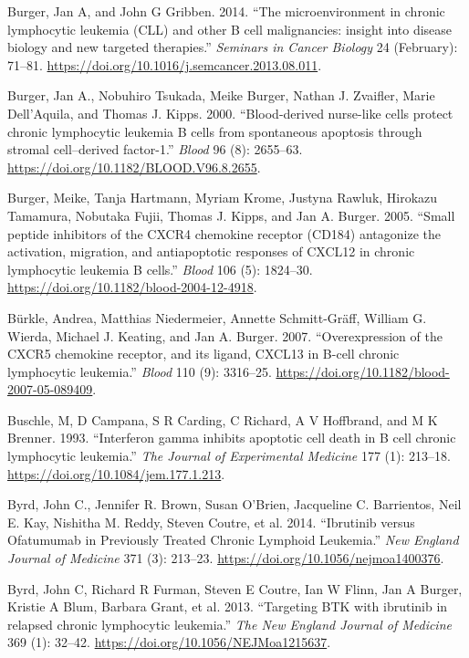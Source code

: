 \documentclass[11pt, a4paper, twosided]{book}
\newenvironment{CSLReferences}%
  {}%
  {\par}
\begin{document}
\begin{CSLReferences}{1}{0}
\leavevmode{}%
Burger, Jan A, and John G Gribben. 2014. {``{The microenvironment in chronic lymphocytic leukemia (CLL) and other B cell malignancies: insight into disease biology and new targeted therapies.}''} \emph{Seminars in Cancer Biology} 24 (February): 71--81. \url{https://doi.org/10.1016/j.semcancer.2013.08.011}.

\leavevmode{}%
Burger, Jan A., Nobuhiro Tsukada, Meike Burger, Nathan J. Zvaifler, Marie Dell'Aquila, and Thomas J. Kipps. 2000. {``{Blood-derived nurse-like cells protect chronic lymphocytic leukemia B cells from spontaneous apoptosis through stromal cell--derived factor-1}.''} \emph{Blood} 96 (8): 2655--63. \url{https://doi.org/10.1182/BLOOD.V96.8.2655}.

\leavevmode{}%
Burger, Meike, Tanja Hartmann, Myriam Krome, Justyna Rawluk, Hirokazu Tamamura, Nobutaka Fujii, Thomas J. Kipps, and Jan A. Burger. 2005. {``{Small peptide inhibitors of the CXCR4 chemokine receptor (CD184) antagonize the activation, migration, and antiapoptotic responses of CXCL12 in chronic lymphocytic leukemia B cells}.''} \emph{Blood} 106 (5): 1824--30. \url{https://doi.org/10.1182/blood-2004-12-4918}.

\leavevmode{}%
Bürkle, Andrea, Matthias Niedermeier, Annette Schmitt-Gräff, William G. Wierda, Michael J. Keating, and Jan A. Burger. 2007. {``{Overexpression of the CXCR5 chemokine receptor, and its ligand, CXCL13 in B-cell chronic lymphocytic leukemia}.''} \emph{Blood} 110 (9): 3316--25. \url{https://doi.org/10.1182/blood-2007-05-089409}.

\leavevmode{}%
Buschle, M, D Campana, S R Carding, C Richard, A V Hoffbrand, and M K Brenner. 1993. {``{Interferon gamma inhibits apoptotic cell death in B cell chronic lymphocytic leukemia.}''} \emph{The Journal of Experimental Medicine} 177 (1): 213--18. \url{https://doi.org/10.1084/jem.177.1.213}.

\leavevmode{}%
Byrd, John C., Jennifer R. Brown, Susan O'Brien, Jacqueline C. Barrientos, Neil E. Kay, Nishitha M. Reddy, Steven Coutre, et al. 2014. {``{Ibrutinib versus Ofatumumab in Previously Treated Chronic Lymphoid Leukemia}.''} \emph{New England Journal of Medicine} 371 (3): 213--23. \url{https://doi.org/10.1056/nejmoa1400376}.

\leavevmode{}%
Byrd, John C, Richard R Furman, Steven E Coutre, Ian W Flinn, Jan A Burger, Kristie A Blum, Barbara Grant, et al. 2013. {``{Targeting BTK with ibrutinib in relapsed chronic lymphocytic leukemia.}''} \emph{The New England Journal of Medicine} 369 (1): 32--42. \url{https://doi.org/10.1056/NEJMoa1215637}.


\end{CSLReferences}
\end{document}
